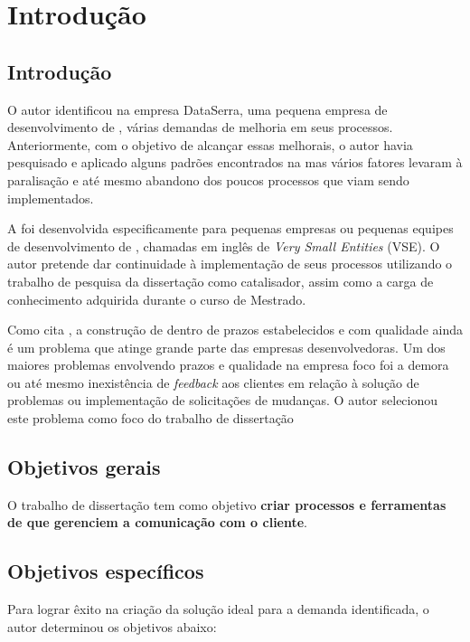 
\chapter{Introdução}

\section{Introdução}

O autor identificou na empresa DataSerra, uma pequena empresa de desenvolvimento de \sw, várias demandas de melhoria em seus processos. Anteriormente, com o objetivo de alcançar essas melhorais, o autor havia pesquisado e aplicado alguns padrões encontrados na \iso mas vários fatores levaram à paralisação e até mesmo abandono dos poucos processos que viam sendo implementados.

A \iso foi desenvolvida especificamente para pequenas empresas ou pequenas equipes de desenvolvimento de \sw, chamadas em inglês de \textit{Very Small Entities} (VSE). O autor pretende dar continuidade à implementação de seus processos utilizando o trabalho de pesquisa da dissertação como catalisador, assim como a carga de conhecimento adquirida durante o curso de Mestrado.

Como cita \cite{pressman}, a construção de \sw dentro de prazos estabelecidos e com qualidade ainda é um problema que atinge grande parte das empresas desenvolvedoras. Um dos maiores problemas envolvendo prazos e qualidade na empresa foco foi a demora ou até mesmo inexistência de \textit{feedback} aos clientes em relação à solução de problemas ou implementação de solicitações de mudanças. O autor selecionou este problema como foco do trabalho de dissertação 

\section{Objetivos gerais}

O trabalho de dissertação tem como objetivo \textbf{criar processos e ferramentas de \sw que gerenciem a comunicação com o cliente}.

\section{Objetivos específicos}

Para lograr êxito na criação da solução ideal para a demanda identificada, o autor determinou os objetivos abaixo:

